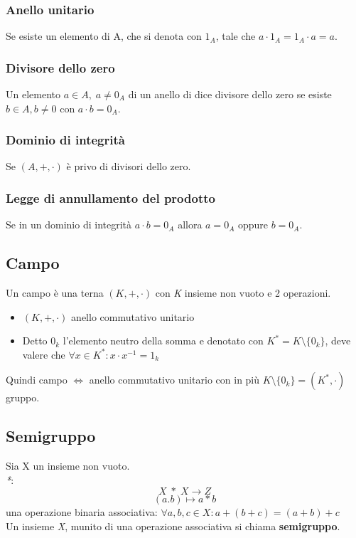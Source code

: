 \subsubsection{Anello unitario} 
Se esiste un elemento di A, che si denota con \(1_A\), tale che \(a\cdot 1_A=1_A\cdot a=a\).

\subsubsection{Divisore dello zero} 
Un elemento \(a\in A,\; a\neq0_A\) di un anello di dice divisore dello zero se esiste \(b\in A,b\neq 0\) con \(a\cdot b=0_A\).

\subsubsection{Dominio di integrità} 
Se \((A,+,\cdot)\) è privo di divisori dello zero.

\subsubsection{Legge di annullamento del prodotto} 
Se in un dominio di integrità \(a\cdot b=0_A\) allora \(a=0_A\) oppure \(b=0_A\).

\subsection{Campo}
Un campo è una terna \((K,+,\cdot)\) con \textit{K} insieme non vuoto e 2 operazioni.
\begin{itemize}
    \item \((K,+,\cdot)\) anello commutativo unitario
    \item Detto \(0_k\) l'elemento neutro della somma e denotato con \(K^*=K\setminus\{0_k\}\), deve valere che \(\forall x\in K^*:x\cdot x^{-1}=1_k\)
\end{itemize}
Quindi campo \(\Leftrightarrow\) anello commutativo unitario con in più \(K\setminus\{0_k\}=(K^*,\cdot)\) gruppo.

\subsection{Semigruppo}
Sia X un insieme non vuoto. 
\\\textit{*}:
\[X\;*\;X\rightarrow Z\]
\[(a.b)\mapsto a * b\]
una operazione binaria associativa: \(\forall a,b,c\in X: a+(b+c)=(a+b)+c\)
\\
Un insieme \textit{X}, munito di una operazione associativa si chiama \textbf{semigruppo}.

